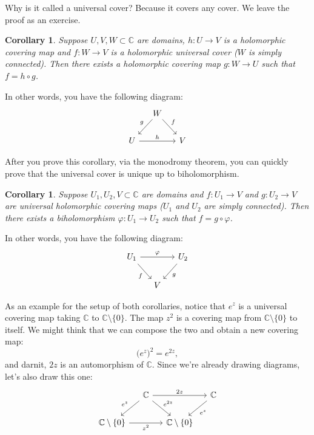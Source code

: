 \documentclass[12pt,openany]{book}
\newcommand{\C}{{\mathbb{C}}}
\theoremstyle{plain}
\newtheorem{cor}[thm]{Corollary}
\theoremstyle{remark}
\theoremstyle{definition}
\theoremstyle{exercise}
\theoremstyle{example}
\begin{document}
Why is it called a universal cover?  Because it covers any cover.
We leave the proof as an exercise.

\begin{cor} \label{cor:coverscover}
Suppose $U,V,W \subset \C$ are domains, $h \colon U \to V$ is a 
holomorphic covering map and $f \colon W \to V$ is a holomorphic universal cover ($W$ is
simply connected).  Then there exists a holomorphic covering map
$g \colon W \to U$ such that $f = h \circ g$.
\end{cor}

In other words, you have the following diagram:
\begin{equation*}
\begin{tikzcd}[column sep=small]
& W \arrow[dl,"g"'] \arrow[dr,"f"] \\
U \arrow[rr,"h"]                   & & V
\end{tikzcd}
\end{equation*}

After you prove this corollary, via the monodromy theorem, you can quickly
prove
that the universal cover is unique up to biholomorphism.

\begin{cor} \label{cor:univcoveruniqe}
Suppose $U_1,U_2,V \subset \C$ are domains and $f \colon U_1 \to V$ and $g \colon
U_2 \to V$ are
universal holomorphic covering maps ($U_1$ and $U_2$ are simply connected).
Then there
exists a biholomorphism $\varphi \colon U_1 \to U_2$
such that $f = g \circ \varphi$.
\end{cor}

In other words, you have the following diagram:
\begin{equation*}
\begin{tikzcd}[column sep=small]
U_1 \arrow[rr,"\varphi"] \arrow[dr,"f"'] & & U_2 \arrow[dl,"g"] \\
                               & V
\end{tikzcd}
\end{equation*}

As an example for the setup of both corollaries,
notice that $e^z$ is a universal covering map taking $\C$ to $\C \setminus \{ 0 \}$.
The map $z^2$ is a covering map from $\C \setminus \{ 0 \}$ to itself.
We might think that we can compose the two and obtain a new covering map:
\begin{equation*}
{\bigl(e^z\bigr)}^2 = e^{2z} ,
\end{equation*}
and darnit, $2z$ is an automorphism of $\C$.  Since we're already drawing diagrams,
let's also draw this one:
\begin{equation*}
\begin{tikzcd}[column sep=small]
& \C \arrow[dl,"e^z"'] \arrow[dr,"e^{2z}"] \arrow[rr,"2z"] & & \C \arrow[dl,"e^z"] \\
\C \setminus \{ 0 \} \arrow[rr,"z^2"'] & & \C \setminus \{ 0 \} 
\end{tikzcd}
\end{equation*}
\end{document}
